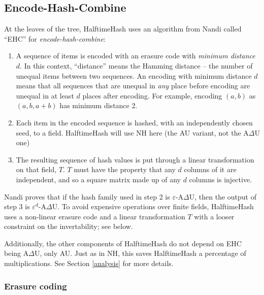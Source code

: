\documentclass[acmsmall, nonacm]{acmart}
\begin{document}

\subsection{Encode-Hash-Combine}

At the leaves of the tree, HalftimeHash uses an algorithm from Nandi called ``EHC'' for {\em encode-hash-combine}: \cite{ehc-nandi}

\begin{enumerate}
\item A sequence of items is encoded with an erasure code with {\em minimum distance $d$}.
  In this context, ``distance'' means the Hamming distance -- the number of unequal items between two sequences.
  An encoding with minimum distance $d$ means that all sequences that are unequal in {\em any} place before encoding are unequal in at least $d$ places after encoding.
  For example, encoding $(a,b)$ as $(a,b,a+b)$ has minimum distance 2.
\item Each item in the encoded sequence is hashed, with an independently chosen seed, to a field.
  HalftimeHash will use NH here (the AU variant, not the A$\Delta$U one)
\item The resulting sequence of hash values is put through a linear transformation on that field, $T$.
  $T$ must have the property that any $d$ columns of it are independent, and so a square matrix made up of any $d$ columns is injective.
\end{enumerate}

Nandi proves that if the hash family used in step 2 is $\varepsilon$-A$\Delta$U, then the output of step 3 is $\varepsilon^d$-A$\Delta$U.
To avoid expensive operations over finite fields, HalftimeHash uses a non-linear erasure code and a linear transformation $T$ with a looser constraint on the invertability; see below.

Additionally, the other components of HalftimeHash do not depend on EHC being A$\Delta$U, only AU.
Just as in NH, this saves HalftimeHash a percentage of multiplications.
See Section \ref{analysis} for more details.

\subsubsection{Erasure coding}
\end{document}
